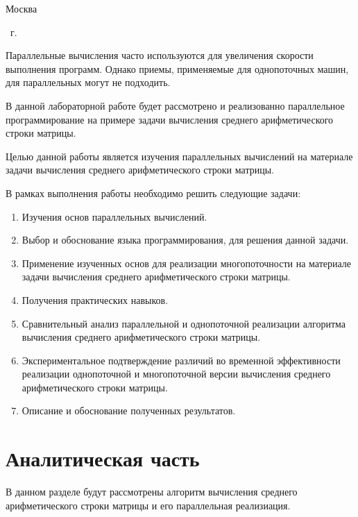 \begin{center}
	\mbox{}
	\vfill
	Москва
\end{center}

\begin{center}
	\the\year ~г.
\end{center}
\clearpage

\renewcommand\contentsname{\hfill{\normalfont{СОДЕРЖАНИЕ}}\hfill}  %
\tableofcontents
\newpage


Параллельные вычисления часто используются для увеличения скорости выполнения
программ. Однако приемы, применяемые для однопоточных машин, для
параллельных могут не подходить.

В данной лабораторной работе будет рассмотрено и реализованно параллельное
программирование на примере задачи вычисления среднего арифметического строки матрицы.

Целью данной работы является изучения параллельных вычислений на материале
задачи вычисления среднего арифметического строки матрицы.

В рамках выполнения работы необходимо решить следующие задачи:

\begin{enumerate}
	\item Изучения основ параллельных вычислений.
	\item Выбор и обоснование языка программирования, для решения данной задачи.
	\item Применение изученных основ для реализации многопоточности на материале задачи вычисления среднего арифметического строки матрицы.
	\item Получения практических навыков.
	\item Сравнительный анализ параллельной и однопоточной реализации алгоритма вычисления среднего арифметического строки матрицы.
	\item Экспериментальное подтверждение различий во временной эффективности реализации однопоточной и многопоточной версии вычисления среднего арифметического строки матрицы.
	\item Описание и обоснование полученных результатов.
\end{enumerate}


\section{Аналитическая часть}

В данном разделе будут рассмотрены алгоритм вычисления среднего арифметического строки матрицы и его параллельная реализиация.

